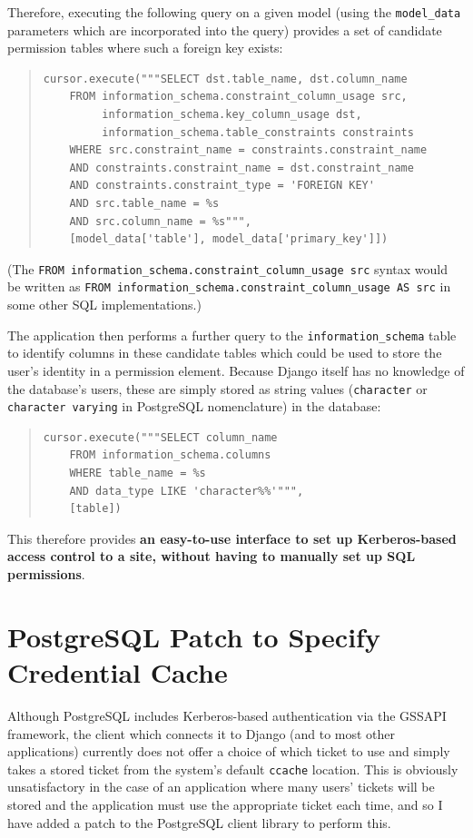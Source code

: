 \documentclass[12pt]{report}
\begin{document}
Therefore, executing the following query on a given model (using the \verb+model_data+ parameters which are incorporated into the query) provides a set of candidate permission tables where such a foreign key exists:

\begin{quote}
\begin{verbatim}
cursor.execute("""SELECT dst.table_name, dst.column_name
    FROM information_schema.constraint_column_usage src,
         information_schema.key_column_usage dst,
         information_schema.table_constraints constraints
    WHERE src.constraint_name = constraints.constraint_name
    AND constraints.constraint_name = dst.constraint_name
    AND constraints.constraint_type = 'FOREIGN KEY'
    AND src.table_name = %s
    AND src.column_name = %s""",
    [model_data['table'], model_data['primary_key']])
\end{verbatim}
\end{quote}

(The \verb+FROM information_schema.constraint_column_usage src+ syntax would be written as \verb+FROM information_schema.constraint_column_usage AS src+ in some other SQL implementations.)

The application then performs a further query to the \verb+information_schema+ table to identify columns in these candidate tables which could be used to store the user's identity in a permission element. Because Django itself has no knowledge of the database's users, these are simply stored as string values (\texttt{character} or \texttt{character varying} in PostgreSQL nomenclature) in the database:

\begin{quote}
\begin{verbatim}
cursor.execute("""SELECT column_name
    FROM information_schema.columns
    WHERE table_name = %s
    AND data_type LIKE 'character%%'""",
    [table])
\end{verbatim}
\end{quote}

This therefore provides \textbf{an easy-to-use interface to set up Kerberos-based access control to a site, without having to manually set up SQL permissions}.

\section{PostgreSQL Patch to Specify Credential Cache}
\label{sec:postgresql_patch}
Although PostgreSQL includes Kerberos-based authentication via the GSSAPI framework\cite{postgres-GSSAPI}, the client which connects it to Django (and to most other applications) currently does not offer a choice of which ticket to use and simply takes a stored ticket from the system's default \texttt{ccache} location. This is obviously unsatisfactory in the case of an application where many users' tickets will be stored and the application must use the appropriate ticket each time, and so I have added a patch to the PostgreSQL client library to perform this.
\end{document}
